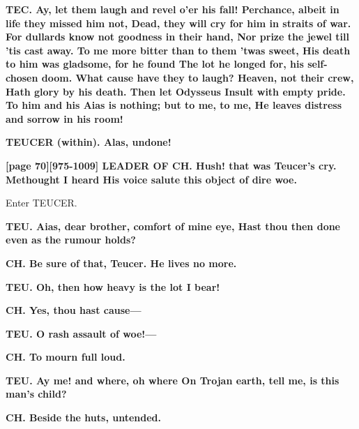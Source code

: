 \documentclass[11pt,letter]{book}
\begin{document}
\par \textbf{TEC. Ay, let them laugh and revel o’er his fall! Perchance, albeit in life they missed him not, Dead, they will cry for him in straits of war. For dullards know not goodness in their hand, Nor prize the jewel till ’tis cast away. To me more bitter than to them ’twas sweet, His death to him was gladsome, for he found The lot he longed for, his self-chosen doom. What cause have they to laugh? Heaven, not their crew, Hath glory by his death. Then let Odysseus Insult with empty pride. To him and his Aias is nothing; but to me, to me, He leaves distress and sorrow in his room!}
\par 

\par \textbf{TEUCER (within). Alas, undone!}
\par 

\par \textbf{[page 70][975-1009] LEADER OF CH. Hush! that was Teucer’s cry. Methought I heard His voice salute this object of dire woe.}
\par 

\par  Enter TEUCER.

\par \textbf{TEU. Aias, dear brother, comfort of mine eye, Hast thou then done even as the rumour holds?}
\par 

\par \textbf{CH. Be sure of that, Teucer. He lives no more.}
\par 

\par \textbf{TEU. Oh, then how heavy is the lot I bear!}
\par 

\par \textbf{CH. Yes, thou hast cause—}
\par 

\par \textbf{TEU. O rash assault of woe!—}
\par 

\par \textbf{CH. To mourn full loud.}
\par 

\par \textbf{TEU. Ay me! and where, oh where On Trojan earth, tell me, is this man’s child?}
\par 

\par \textbf{CH. Beside the huts, untended.}
\par 
\end{document}
